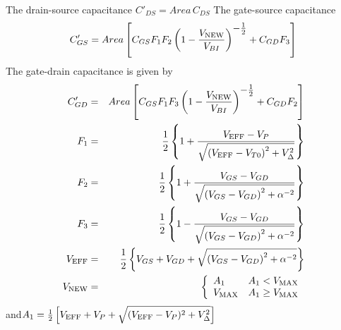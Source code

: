 The drain-source capacitance
$C'_{DS} = Area\,C_{DS}$\inlineeq
The gate-source capacitance
\begin{equation}
C'_{GS} = Area\left[C_{GS}F_1F_2\left(1 - {{\textstyle V_{\mbox{\scriptsize NEW}}}
   \over{\textstyle V_{BI}}}\right)^{\textstyle - \frac{1}{2}}
   + C_{GD}F_3\right]
\end{equation}
The gate-drain capacitance is given by
\begin{eqnarray}
C'_{GD} &=& Area\left[C_{GS}F_1F_3\left(1 - {{\textstyle V_{\ms{NEW}}}
   \over{\textstyle V_{BI}}}\right)^{\textstyle - \frac{1}{2}}
   + C_{GD}F_2\right]\\
F_1 & = & {{\textstyle 1}\over{\textstyle 2}} \left\{ 1 +
    {{\textstyle V_{\ms{EFF}}-V_P}
    \over{\textstyle\sqrt{\left( V_{\ms{EFF}}-V_{T0}\right)^2+V_{\Delta}^2}}}\right\}\\
F_2 & = & {{\textstyle 1}\over{\textstyle 2}} \left\{ 1 +
    {{\textstyle V_{GS}-V_{GD}}
    \over{\textstyle\sqrt{\left( V_{GS}-V_{GD}\right)^2+\alpha^{-2}}}}\right\}\\
F_3 & = & {{\textstyle 1}\over{\textstyle 2}} \left\{ 1 -
    {{\textstyle V_{GS}-V_{GD}}
    \over{\textstyle\sqrt{\left( V_{GS}-V_{GD}\right)^2+\alpha^{-2}}}}\right\}\\
V_{\ms{EFF}} & = & {{\textstyle 1}\over{\textstyle 2}} \left\{V_{GS}+V_{GD}+
    \sqrt{\left( V_{GS}-V_{GD}\right)^2+\alpha^{-2}}\right\}\\
V_{\ms{NEW}}&=&\left\{ \begin{array}{ll}
    A_1 & A_1 < V_{\ms{MAX}} \\
    V_{\ms{MAX}} & A_1 \ge V_{\ms{MAX}} \\
      \end{array} \right. %
\end{eqnarray}
and\hfill$A_1 = \frac{1}{2}\left[V_{\mbox{\scriptsize EFF}} + V_P + \sqrt{(V_{\mbox{\scriptsize EFF}}-V_P)^2+V_{\Delta}^2}\right]$
\inlineeq

